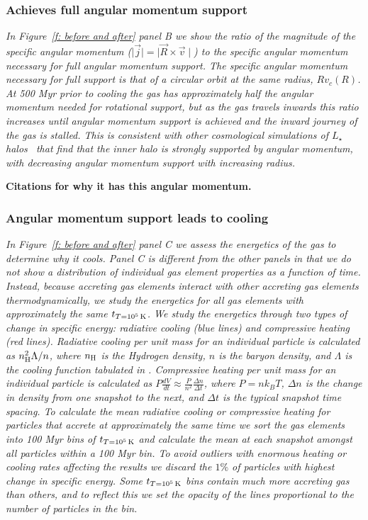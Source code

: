\documentclass[fleqn,usenatbib]{mnras}
\newcommand{\tcon}{t_{T=10^5\,{\rm K}}}
\newcommand{\nH}{n_{\rm H}}
\begin{document}
\subsubsection{Achieves full angular momentum support}

\textit{
In Figure~\ref{f: before and after} panel B we show the ratio of the magnitude of the specific angular momentum ($\mid \vec j \mid = \mid \vec R \times \vec v \mid$) to the specific angular momentum necessary for full angular momentum support.
The specific angular momentum necessary for full support is that of a circular orbit at the same radius, $R v_c(R)$.
At 500 Myr prior to cooling the gas has approximately half the angular momentum needed for rotational support, but as the gas travels inwards this ratio increases until angular momentum support is achieved and the inward journey of the gas is stalled.
This is consistent with other cosmological simulations of $L_\star$ halos~\citep[e.g.][]{Oppenheimer2018} that find that the inner halo is strongly supported by angular momentum, with decreasing angular momentum support with increasing radius.
}

\textbf{Citations for why it has this angular momentum.}

\subsubsection{Angular momentum support leads to cooling}

\textit{
In Figure~\ref{f: before and after} panel C we assess the energetics of the gas to determine why it cools.
Panel C is different from the other panels in that we do not show a distribution of individual gas element properties as a function of time.
Instead, because accreting gas elements interact with other accreting gas elements thermodynamically, we study the energetics for all gas elements with approximately the same $\tcon$.
We study the energetics through two types of change in specific energy: radiative cooling (blue lines) and compressive heating (red lines).
Radiative cooling per unit mass for an individual particle is calculated as $\nH^2 \Lambda / n$, where $\nH$ is the Hydrogen density, $n$ is the baryon density, and $\Lambda$ is the cooling function tabulated in \cite{Wiersma2009a}.
Compressive heating per unit mass for an individual particle is calculated as $P \frac{dV}{dt} \approx \frac{ P }{ n^2 } \frac{ \Delta n }{ \Delta t }$, where $P = n k_B T$, $\Delta n$ is the change in density from one snapshot to the next, and $\Delta t$ is the typical snapshot time spacing.
To calculate the mean radiative cooling or compressive heating for particles that accrete at approximately the same time we sort the gas elements into 100 Myr bins of $\tcon$ and calculate the mean at each snapshot amongst all particles within a 100 Myr bin.
To avoid outliers with enormous heating or cooling rates affecting the results we discard the $1\%$ of particles with highest change in specific energy.
Some $\tcon$ bins contain much more accreting gas than others, and to reflect this we set the opacity of the lines proportional to the number of particles in the bin.
}
\end{document}
